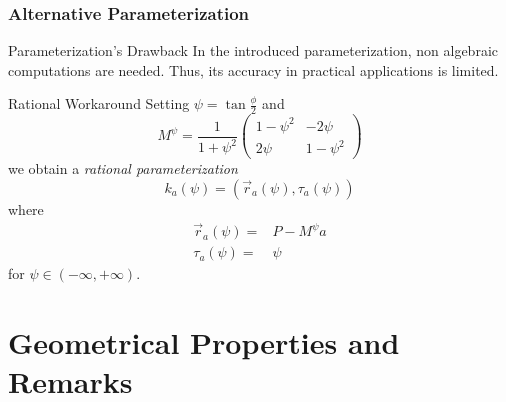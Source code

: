 \documentclass[ucs,9pt,pagenumbersfull]{beamer}
\begin{document}
\begin{frame}
  \frametitle{Alternative Parameterization}
  \begin{block}{Parameterization's Drawback}
    In the introduced parameterization, non algebraic computations are
    needed. Thus, its accuracy in practical applications is limited.
  \end{block}
  \begin{block}{Rational Workaround}
    Setting \(\psi=\tan \frac{\phi}{2}\) and
    \[
    M^\psi = \frac{1}{1+\psi^2}\begin{pmatrix}
      1-\psi^2 & -2 \psi \\
      2\psi & 1-\psi^2
    \end{pmatrix}
    \]
    we obtain a \emph{rational parameterization}
    \[
    k_a(\psi) = \left( \vec{r}_a(\psi),\tau_a(\psi)\right)
    \]
    where
    \begin{align*}
      \vec{r}_a(\psi) = & P - M^\psi a\\
      \tau_a(\psi) = & \psi
    \end{align*}
for \(\psi\in (-\infty,+\infty)\).
  \end{block}
\end{frame}

\section{Geometrical Properties and Remarks}
\end{document}
